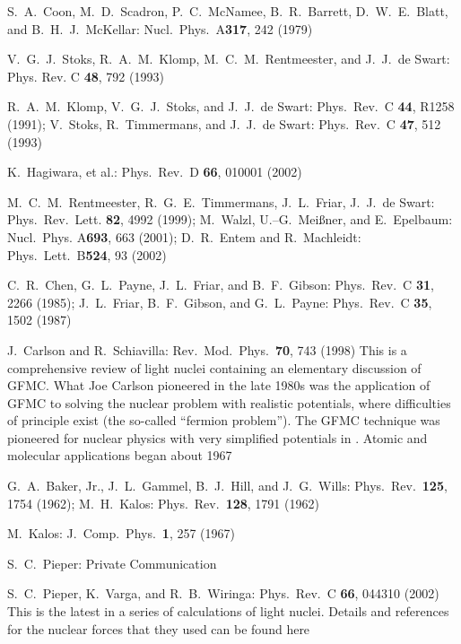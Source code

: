 \documentclass{svmult}
\begin{document}
\begin{thebibliography}{999}
 S.\ A.\ Coon, M.\ D.\ Scadron, P.\ C.\ McNamee, B.\ R.\ Barrett,
D.\ W.\ E.\ Blatt, and B.\ H.\ J.\ McKellar: Nucl.\ Phys.\ A{\bf 317}, 
242 (1979)

 V.\ G.\ J.\ Stoks, R.\ A.\ M.\ Klomp, M.\ C.\ M.\ Rentmeester, 
and J.\ J.\ de Swart: Phys. Rev. C {\bf 48}, 792 (1993)

 R.\ A.\ M.\ Klomp, V.\ G.\ J.\ Stoks, and J.\ J.\ de Swart:
Phys.\ Rev.\ C {\bf 44}, R1258 (1991); V.\ Stoks, R.\ Timmermans,
and J.\ J.\ de Swart: Phys.\ Rev.\ C {\bf 47}, 512 (1993)

 K.\ Hagiwara, et al.: Phys.\ Rev.\ D {\bf66}, 010001 (2002)

 M.\ C.\ M.\ Rentmeester, R.\ G.\ E.\ Timmermans, J.\ L.\ Friar, 
J.\ J.\ de Swart: Phys.\ Rev.\ Lett. {\bf 82}, 4992 (1999); M.\ Walzl, 
U.--G.\ Mei\ss ner, and E.\ Epelbaum: Nucl.\ Phys. A{\bf 693}, 663 (2001);
D.\ R.\ Entem and R.\ Machleidt: Phys.\ Lett.\ B{\bf 524}, 93 (2002)

 C.\ R.\ Chen, G.\ L.\ Payne, J.\ L.\ Friar, and B.\ F.\ Gibson:
Phys.\ Rev.\ C {\bf 31}, 2266 (1985); J.\ L.\ Friar, B.\ F.\ Gibson, and 
G.\ L.\ Payne: Phys.\ Rev.\ C {\bf 35}, 1502 (1987)

 J.\ Carlson and R.\ Schiavilla: Rev.\ Mod.\ Phys.\ {\bf 70}, 743
(1998) This is a comprehensive review of light nuclei containing an elementary 
discussion of GFMC. What Joe Carlson pioneered in the late 1980s was the 
application of GFMC to solving the nuclear problem with realistic potentials, 
where difficulties of principle exist (the so-called ``fermion problem''). The 
GFMC technique was pioneered for nuclear physics with very simplified potentials
in \cite{GFMC-h}. Atomic and molecular applications began about 
1967\cite{GFMC-at}

 G.\ A.\ Baker, Jr., J.\ L.\ Gammel, B.\ J.\ Hill, and J.\ G.\ 
Wills: Phys.\ Rev.\  {\bf 125}, 1754 (1962); M.\ H.\ Kalos: Phys.\ Rev.\ 
{\bf 128}, 1791 (1962)

 M.\ Kalos: J.\ Comp.\ Phys.\ {\bf 1}, 257 (1967)

\bibitem{steve} S.\ C.\ Pieper: Private Communication

 S.\ C.\ Pieper, K.\ Varga, and R.\ B.\ Wiringa: Phys.\ Rev.\ C
{\bf 66}, 044310 (2002) This is the latest in a series of calculations of
light nuclei. Details and references for the nuclear forces that they used can 
be found here


\end{thebibliography}
\end{document}
